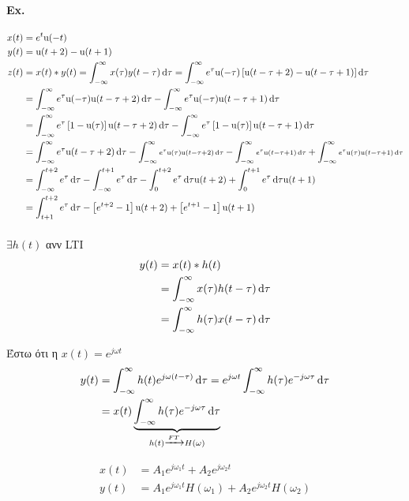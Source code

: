 	\paragraph{Ex.}
	\begin{align*}
	x(t) &= e^t\mathrm u(-t) \\
	y(t) &= \mathrm u(t+2)-\mathrm u(t+1) \\
	z(t) &= x(t) * y(t) = \int_{-\infty}^{\infty} x(\tau)y(t-\tau)\dif\tau
	= \int_{-\infty}^{\infty} e^\tau\mathrm u(-\tau)\left[
	\mathrm u(t-\tau+2)-\mathrm u(t-\tau+1)
	\right]\dif\tau
	\\ &= \int_{-\infty}^{\infty} e^\tau
	\mathrm u(-\tau)\mathrm u(t-\tau+2)\dif\tau - \int_{-\infty}^{\infty}
	e^\tau \mathrm u(-\tau)\mathrm u(t-\tau+1)\dif\tau
	\\ &= \int_{-\infty}^{\infty} e^\tau
	\left[ 1-\mathrm u(\tau) \right]\mathrm u(t-\tau+2)\dif\tau -
	\int_{-\infty}^{\infty} e^\tau \left[ 1-\mathrm u(\tau) \right]
	\mathrm u(t-\tau+1)\dif\tau
	\\ &= \int_{-\infty}^{\infty}
	\mathsmaller{e^\tau \mathrm u(t-\tau+2)\dif\tau}
	- \int_{-\infty}^{\infty}
	\mathsmaller{\mathsmaller{
		 e^\tau \mathrm u(\tau) \mathrm u(t-\tau+2)\dif\tau}}
	- \int_{-\infty}^{\infty}
	\mathsmaller{\mathsmaller{ e^\tau \mathrm u(t-\tau+1)\dif\tau}}
	+ \int_{-\infty}^{\infty}\mathsmaller{\mathsmaller{
		 e^\tau \mathrm u(\tau)\mathrm u(t-\tau+1)\dif\tau}}
	\\ &= \int_{-\infty}^{t+2} e^\tau\dif\tau - \int_{-\infty}^{t+1}e^\tau\dif\tau
	- \int_0^{t+2}e^\tau\dif\tau\mathrm u(t+2)
	+ \int_0^{t+1}e^\tau\dif\tau \mathrm u(t+1)
	\\ &= \int_{t+1}^{t+2}e^\tau\dif\tau
	-\left[ e^{t+2}-1 \right]\mathrm u(t+2)
	+\left[ e^{t+1}-1 \right]\mathrm u(t+1)
	\end{align*}

	\vspace{1cm}
	\paragraph{}
	\( \exists h(t) \) ανν LTI
	\begin{align*}
		y(t) &= x(t)*h(t) \\ &=\int_{-\infty}^{\infty} x(\tau)h(t-\tau)\mathop{}\!\mathrm{d}\tau
		\\ &= \int_{-\infty}^{\infty} h(\tau)x(t-\tau)\mathop{}\!\mathrm{d}\tau
	\end{align*}

	Έστω ότι η \( x(t) = e^{j\omega t} \)
	\begin{align*}
	y(t) &= \int_{-\infty}^{\infty} h(t) e^{j\omega(t-\tau)}\dif\tau
	= e^{j\omega t} \int_{-\infty}^{\infty} h(\tau)e^{-j\omega\tau}\dif\tau
	\\ &= x(t)\underbrace{\int_{-\infty}^{\infty} h(\tau)e^{-j\omega\tau}\dif\tau}_{\mathclap{h(t) \xrightarrow{FT} H(\omega)}}
	\end{align*}

	\begin{align*}
	x(t) &= A_1e^{j\omega_1 t} + A_2e^{j\omega_2 t} \\
	y(t) &= A_1e^{j\omega_1 t}H(\omega_1)+A_2e^{j\omega_2t}H(\omega_2)
	\end{align*}
